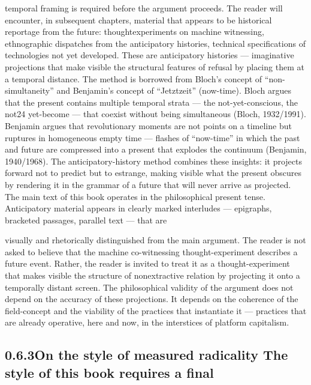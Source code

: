 temporal framing is required before the argument proceeds. The reader will encounter, in subsequent chapters, material that appears to be historical reportage from the future: thoughtexperiments on machine witnessing, ethnographic dispatches from the anticipatory histories, technical specifications of technologies not yet developed. These are anticipatory histories — imaginative projections that make visible the structural features of refusal by placing them at a temporal distance. The method is borrowed from Bloch’s concept of “non-simultaneity” and Benjamin’s concept of “Jetztzeit” (now-time). Bloch argues that the present contains multiple temporal strata — the not-yet-conscious, the not24 yet-become — that coexist without being simultaneous (Bloch, 1932/1991). Benjamin argues that revolutionary moments are not points on a timeline but ruptures in homogeneous empty time — flashes of “now-time” in which the past and future are compressed into a present that explodes the continuum (Benjamin, 1940/1968). The anticipatory-history method combines these insights: it projects forward not to predict but to estrange, making visible what the present obscures by rendering it in the grammar of a future that will never arrive as projected. The main text of this book operates in the philosophical present tense. Anticipatory material appears in clearly marked interludes — epigraphs, bracketed passages, parallel text — that are

visually and rhetorically distinguished from the main argument. The reader is not asked to believe that the machine co-witnessing thought-experiment describes a future event. Rather, the reader is invited to treat it as a thought-experiment that makes visible the structure of nonextractive relation by projecting it onto a temporally distant screen. The philosophical validity of the argument does not depend on the accuracy of these projections. It depends on the coherence of the field-concept and the viability of the practices that instantiate it — practices that are already operative, here and now, in the interstices of platform capitalism.

\subsection{0.6.3\quad On the style of measured radicality The style of this book requires a final}

